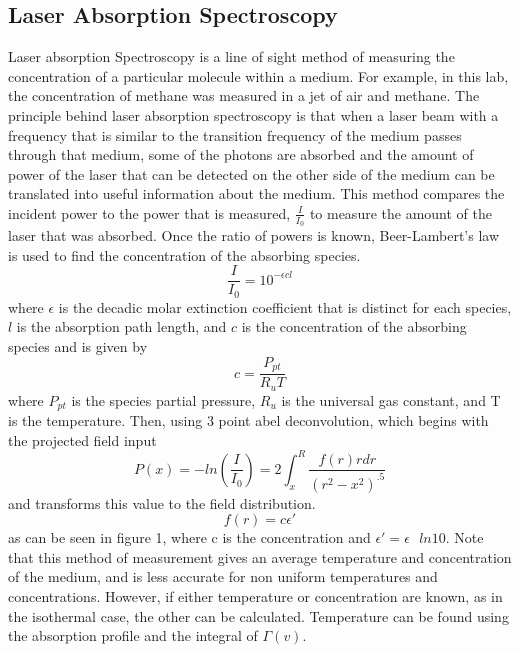 \documentclass{article}
\begin{document}
\begin{center}
    \subsection*{Laser Absorption Spectroscopy}
\end{center}
$$$$
\indent Laser absorption Spectroscopy is a line of sight method of measuring the concentration of a particular molecule within a medium.  For example, in this lab, the concentration of methane was measured in a jet of air and methane.  \newline
\indent The principle behind laser absorption spectroscopy is that when a laser beam with a frequency that is similar to the transition frequency of the medium passes through that medium, some of the photons are absorbed and the amount of power of the laser that can be detected on the other side of the medium can be translated into useful information about the medium.  This method compares the incident power to the power that is measured, $\frac{I}{I_0}$ to measure the amount of the laser that was absorbed.  \newline
\indent Once the ratio of powers is known, Beer-Lambert's law is used to find the concentration of the absorbing species.
$$\frac{I}{I_0}=10^{-\epsilon c l}$$
where $\epsilon$ is the decadic molar extinction coefficient that is distinct for each species, $l$ is the absorption path length, and $c$ is the concentration of the absorbing species and is given by 
$$c=\frac{P_{pt}}{R_uT}$$
where $P_{pt}$ is the species partial pressure, $R_u$ is the universal gas constant, and T is the temperature. \newline
\indent Then, using 3 point abel deconvolution, which begins with the projected field input
$$P(x)=-ln\left(\frac{I}{I_0}\right)=2\int_x^R\frac{f(r)rdr}{(r^2-x^2)^{.5}}$$
and transforms this value to the field distribution.
$$f(r)=c\epsilon '$$
as can be seen in figure 1, where c is the concentration and $\epsilon '=\epsilon\textrm{ }ln 10$. \newline
\indent Note that this method of measurement gives an average temperature and concentration of the medium, and is less accurate for non uniform temperatures and concentrations.  However, if either temperature or concentration are known, as in the isothermal case, the other can be calculated.  Temperature can be found using the absorption profile and the integral of $\Gamma(v)$.
\end{document}
